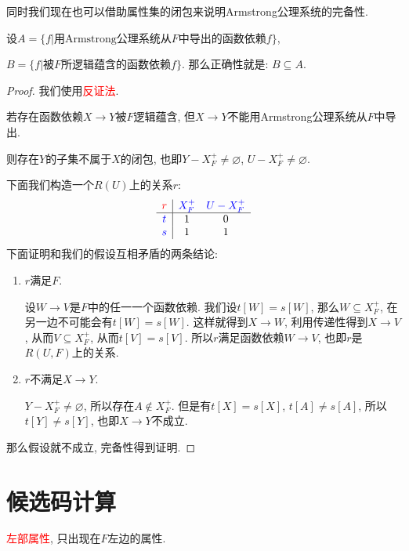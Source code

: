 同时我们现在也可以借助属性集的闭包来说明Armstrong公理系统的完备性.
\begin{theorem}[完备性]
  设$A=\{f|\text{用Armstrong公理系统从}F\text{中导出的函数依赖}f\}$, 
  
  $B=\{f|\text{被}F\text{所逻辑蕴含的函数依赖}f\}$. 那么正确性就是: $B\subseteq A$.
\end{theorem}

\begin{proof}
  我们使用\textcolor{red}{反证法}.

  若存在函数依赖$X\to Y$被$F$逻辑蕴含, 但$X\to Y$不能用Armstrong公理系统从$F$中导出.
  
  则存在$Y$的子集不属于$X$的闭包, 也即$Y-X_F^+\neq \varnothing$, $U-X_F^+\neq \varnothing$.

  下面我们构造一个$R(U)$上的关系$r$:
  \begin{align*}
    \begin{array}{c|cc}
      \textcolor{red}{r} & \textcolor{blue}{X_F^+} & \textcolor{blue}{U - X_F^+} \\
      \hline
      \textcolor{blue}{t} & 1 & 0 \\
      \textcolor{blue}{s} & 1 & 1 \\
    \end{array}
  \end{align*}
  下面证明和我们的假设互相矛盾的两条结论:
  \begin{enumerate}
      \item $r$满足$F$.

      设$W\to V$是$F$中的任一一个函数依赖. 我们设$t[W]=s[W]$, 那么$W\subseteq X_F^+$, 在另一边不可能会有$t[W]=s[W]$. 这样就得到$X\to W$, 利用传递性得到$X\to V$, 从而$V\subseteq X_F^+$, 从而$t[V]=s[V]$. 所以$r$满足函数依赖$W\to V$, 也即$r$是$R(U,F)$上的关系.
      \item $r$不满足$X\to Y$.

      $Y-X_F^+\neq \varnothing$, 所以存在$A\not\in X_F^+$. 但是有$t[X]=s[X]$, $t[A]\neq s[A]$, 所以$t[Y]\neq s[Y]$, 也即$X\to Y$不成立.
  \end{enumerate}
  那么假设就不成立, 完备性得到证明.
\end{proof}

\section{候选码计算}

\begin{definition}[左部属性]
  \textcolor{red}{左部属性}, 只出现在$F$左边的属性.
\end{definition}

